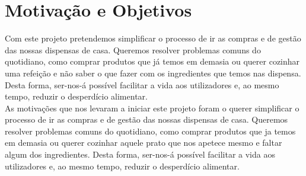 \documentclass[a4paper]{report}
\begin{document}
    \section{Motivação e Objetivos}
    Com este projeto pretendemos simplificar o processo de ir as compras e de
    gestão das nossas dispensas de casa. Queremos resolver problemas comuns do
    quotidiano, como comprar produtos que já temos em demasia ou querer cozinhar
    uma refeição e não saber o que fazer com os ingredientes que temos nas
    dispensa. Desta forma, ser-nos-á possível facilitar a vida aos utilizadores
    e, ao mesmo tempo, reduzir o desperdício alimentar.\\
    As motivações que nos levaram a iniciar este projeto foram o querer simplificar
    o processo de ir as compras e de gestão das nossas dispensas de casa.
    Queremos resolver problemas comuns do quotidiano, como comprar produtos que 
    ja temos em demasia ou querer cozinhar aquele prato que nos apetece mesmo e
    faltar algum dos ingredientes. Desta forma, ser-nos-á possível facilitar a
    vida aos utilizadores e, ao mesmo tempo, reduzir o desperdício alimentar.
\end{document}
